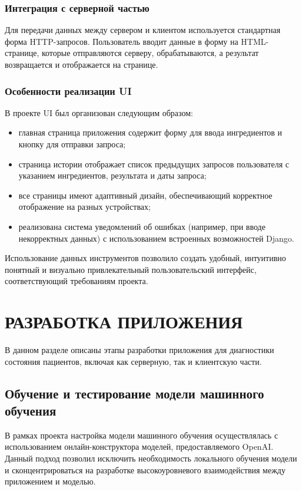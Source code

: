 {\subsubsection*{Интеграция с серверной частью}
Для передачи данных между сервером и клиентом используется стандартная форма HTTP-запросов. Пользователь вводит данные в форму на HTML-странице, которые отправляются серверу, обрабатываются, а результат возвращается и отображается на странице.

\subsubsection*{Особенности реализации UI}
В проекте UI был организован следующим образом:
\begin{itemize}
    \item главная страница приложения содержит форму для ввода ингредиентов и кнопку для отправки запроса;
    \item страница истории отображает список предыдущих запросов пользователя с указанием ингредиентов, результата и даты запроса;
    \item все страницы имеют адаптивный дизайн, обеспечивающий корректное отображение на разных устройствах;
    \item реализована система уведомлений об ошибках (например, при вводе некорректных данных) с использованием встроенных возможностей Django.
\end{itemize}

Использование данных инструментов позволило создать удобный, интуитивно понятный и визуально привлекательный пользовательский интерфейс, соответствующий требованиям проекта.

\newpage

\section{\MakeUppercase{Разработка приложения}}
В данном разделе описаны этапы разработки приложения для диагностики состояния пациентов, включая как серверную, так и клиентскую части.

\subsection{Обучение и тестирование модели машинного обучения}
{
    В рамках проекта настройка модели машинного обучения осуществлялась с использованием онлайн-конструктора моделей, предоставляемого OpenAI. Данный подход позволил исключить необходимость локального обучения модели и сконцентрироваться на разработке высокоуровневого взаимодействия между приложением и моделью.

}}
